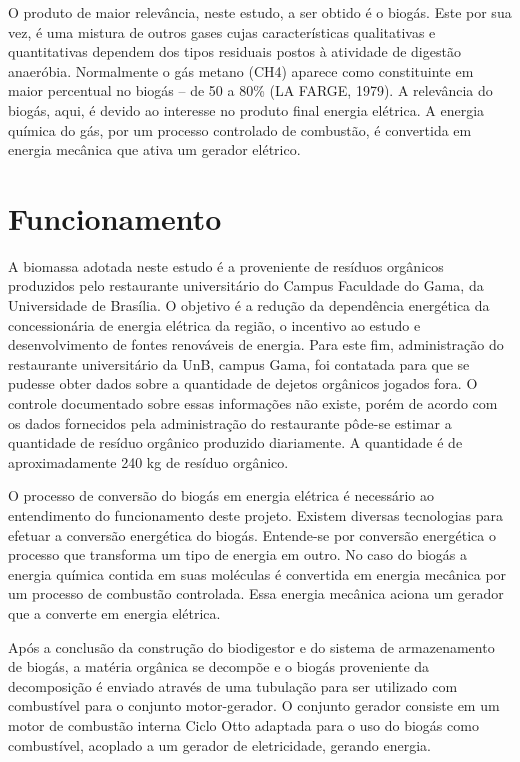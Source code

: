 \par O produto de maior relevância, neste estudo, a ser obtido é o biogás. Este por sua vez, é uma mistura de outros gases cujas características qualitativas e quantitativas dependem dos tipos residuais postos à atividade de digestão anaeróbia. Normalmente o gás metano (CH4) aparece como constituinte em maior percentual no biogás – de 50 a 80\% (LA FARGE, 1979). A relevância do biogás, aqui, é devido ao interesse no produto final energia elétrica. A energia química do gás, por um processo controlado de combustão, é convertida em energia mecânica que ativa um gerador elétrico.

\section {Funcionamento}
A biomassa adotada neste estudo é a proveniente de resíduos orgânicos produzidos pelo restaurante universitário do Campus Faculdade do Gama, da Universidade de Brasília. O objetivo é a redução da dependência energética da concessionária de energia elétrica da região, o incentivo ao estudo e desenvolvimento de fontes renováveis de energia.
Para este fim, administração do restaurante universitário da UnB, campus Gama, foi contatada para que se pudesse obter dados sobre a quantidade de dejetos orgânicos jogados fora. O controle documentado sobre essas informações não existe, porém de acordo com os dados fornecidos pela administração do restaurante pôde-se estimar a quantidade de resíduo orgânico produzido diariamente. A quantidade é de aproximadamente 240 kg de resíduo orgânico.
\par O processo de conversão do biogás em energia elétrica é necessário ao entendimento do funcionamento deste projeto. Existem diversas tecnologias para efetuar a conversão energética do biogás. Entende-se por conversão energética o processo que transforma um tipo de energia em outro. No caso do biogás a energia química contida em suas moléculas é convertida em energia mecânica por um processo de combustão controlada. Essa energia mecânica aciona um gerador que a converte em energia elétrica.
\par Após a conclusão da construção do biodigestor e do sistema de armazenamento de biogás, a matéria orgânica se decompõe e o biogás proveniente da decomposição é enviado através de uma tubulação para ser utilizado com combustível para o conjunto motor-gerador. O conjunto gerador consiste em um motor de combustão interna Ciclo Otto adaptada para o uso do biogás como combustível, acoplado a um gerador de eletricidade, gerando energia.
